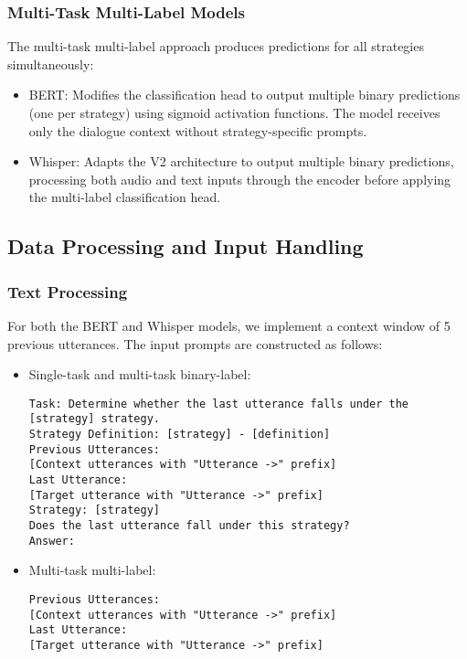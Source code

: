 \documentclass[10pt,twocolumn]{article}
\begin{document}
\subsubsection{Multi-Task Multi-Label Models}
The multi-task multi-label approach produces predictions for all strategies simultaneously:

\begin{itemize}
    \item BERT: Modifies the classification head to output multiple binary predictions (one per strategy) using sigmoid activation functions. The model receives only the dialogue context without strategy-specific prompts.
    
    \item Whisper: Adapts the V2 architecture to output multiple binary predictions, processing both audio and text inputs through the encoder before applying the multi-label classification head.
\end{itemize}

\subsection{Data Processing and Input Handling}

\subsubsection{Text Processing}
For both the BERT and Whisper models, we implement a context window of 5 previous utterances. The input prompts are constructed as follows:

\begin{itemize}
    \item Single-task and multi-task binary-label:
    \begin{lstlisting}
Task: Determine whether the last utterance falls under the [strategy] strategy.
Strategy Definition: [strategy] - [definition]
Previous Utterances:
[Context utterances with "Utterance ->" prefix]
Last Utterance:
[Target utterance with "Utterance ->" prefix]
Strategy: [strategy]
Does the last utterance fall under this strategy?
Answer:
    \end{lstlisting}
    
    \item Multi-task multi-label:
    \begin{lstlisting}
Previous Utterances:
[Context utterances with "Utterance ->" prefix]
Last Utterance:
[Target utterance with "Utterance ->" prefix]
    \end{lstlisting}
\end{itemize}
\end{document}
